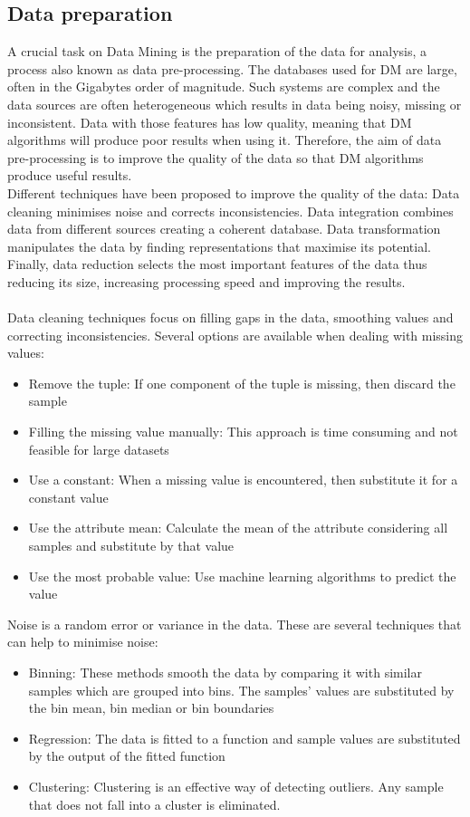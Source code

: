 \documentclass[11pt, oneside]{article}   	%
\begin{document}
\subsection{Data preparation}
A crucial task on Data Mining is the preparation of the data for analysis, a process also known as data pre-processing. The databases used for DM are large, often in the Gigabytes order of magnitude. Such systems are complex and the data sources are often heterogeneous which results in data being noisy, missing or inconsistent. Data with those features has low quality, meaning that DM algorithms will produce poor results when using it. Therefore, the aim of data pre-processing is to improve the quality of the data so that DM algorithms produce useful results.\\
Different techniques have been proposed to improve the quality of the data: Data cleaning minimises noise and corrects inconsistencies. Data integration combines data from different sources creating a coherent database. Data transformation manipulates the data by finding representations that maximise its potential. Finally, data reduction selects the most important features of the data thus reducing its size, increasing processing speed and improving the results.\\\\
Data cleaning techniques focus on filling gaps in the data, smoothing values and correcting inconsistencies. Several options are available when dealing with missing values: 
\begin{itemize}
	\item Remove the tuple: If one component of the tuple is missing, then discard the sample
	\item Filling the missing value manually: This approach is time consuming and not feasible for large datasets
	\item Use a constant: When a missing value is encountered, then substitute it for a constant value
	\item Use the attribute mean: Calculate the mean of the attribute considering all samples and substitute by that value
	\item Use the most probable value: Use machine learning algorithms to predict the value
\end{itemize}
Noise is a random error or variance in the data. These are several techniques that can help to minimise noise:
\begin{itemize}
	\item Binning: These methods smooth the data by comparing it with similar samples which are grouped into bins. The samples' values are substituted by the bin mean, bin median or bin boundaries
	\item Regression: The data is fitted to a function and sample values are substituted by the output of the fitted function
	\item Clustering: Clustering is an effective way of detecting outliers. Any sample that does not fall into a cluster is eliminated. 
\end{itemize}
\end{document}
